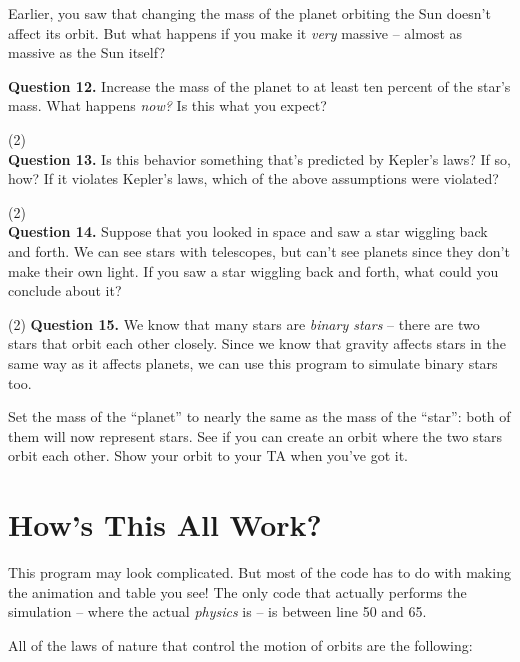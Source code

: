 \documentclass[11pt]{article}
\begin{document}
Earlier, you saw that changing the mass of the planet orbiting the Sun doesn't affect its orbit. But what happens if you make it {\it very} massive -- almost as massive as the Sun itself? 

\textbf{Question 12.} Increase the mass of the planet to at least ten percent of the star's mass. What happens {\it now?} Is this what you expect?

\vspace{1.5cm}

(2) \hrulefill\\


\textbf{Question 13.} Is this behavior something that's predicted by Kepler's laws? If so, how? If it violates Kepler's laws, which of the above assumptions were violated?

\vspace{1.5cm}


(2) \hrulefill\\

\textbf{Question 14.} Suppose that you looked in space and saw a star wiggling back and forth. We can see stars with telescopes, but can't see planets since they don't make their own light. If you saw a star wiggling back and forth, what could you conclude about it?

\vspace{1.5cm}

(2) \textbf{Question 15.} We know that many stars are {\it binary stars} -- there are two stars that orbit each other closely. Since we know that gravity affects stars in the same way as it affects planets, we can use this program to simulate binary stars too. 

Set the mass of the ``planet'' to nearly the same as the mass of the ``star'': both of them will now represent stars. See if you can create an orbit where the two stars orbit each other. Show your orbit to your TA when you've got it.






\section{How's This All Work?}

This program may look complicated. But most of the code has to do with making the animation and table you see! The only code that actually performs the simulation -- where the actual {\it physics} is -- is between line 50 and 65.

All of the laws of nature that control the motion of orbits are the following:
\end{document}
